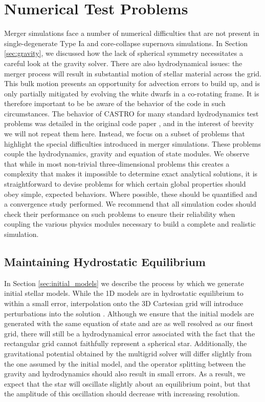 \documentclass[iop]{emulateapj}
\begin{document}
\section{Numerical Test Problems}\label{sec:Tests}

Merger simulations face a number of numerical difficulties that are
not present in single-degenerate Type Ia and core-collapse supernova
simulations. In Section \ref{sec:gravity}, we discussed how the lack
of spherical symmetry necessitates a careful look at the gravity
solver. There are also hydrodynamical issues: the merger process will
result in substantial motion of stellar material across the grid. This
bulk motion presents an opportunity for advection errors to build up,
and is only partially mitigated by evolving the white dwarfs in a
co-rotating frame. It is therefore important to be be aware of the
behavior of the code in such circumstances. The behavior of CASTRO for
many standard hydrodynamics test problems was detailed in the original
code paper \citep{castro}, and in the interest of brevity we will not
repeat them here. Instead, we focus on a subset of problems that
highlight the special difficulties introduced in merger
simulations. These problems couple the hydrodynamics, gravity and
equation of state modules. We observe that while in most non-trivial
three-dimensional problems this creates a complexity that makes it
impossible to determine exact analytical solutions, it is
straightforward to devise problems for which certain global properties
should obey simple, expected behaviors. Where possible, these should
be quantified and a convergence study performed. We recommend that all
simulation codes should check their performance on such problems to
ensure their reliability when coupling the various physics modules
necessary to build a complete and realistic simulation.

\subsection{Maintaining Hydrostatic Equilibrium}\label{sec:HSE}

In Section \ref{sec:initial_models} we describe the process by which
we generate initial stellar models. While the 1D models are in
hydrostatic equilibrium to within a small error, interpolation onto
the 3D Cartesian grid will introduce perturbations into the solution
\citep{zingale:2002}. Although we ensure that the initial models are
generated with the same equation of state and are as well resolved as
our finest grid, there will still be a hydrodynamical error associated
with the fact that the rectangular grid cannot faithfully represent a
spherical star. Additionally, the gravitational potential obtained by
the multigrid solver will differ slightly from the one assumed by the
initial model, and the operator splitting between the gravity and
hydrodynamics should also result in small errors. As a result, we
expect that the star will oscillate slightly about an equilibrium
point, but that the amplitude of this oscillation should decrease with
increasing resolution.
\end{document}

